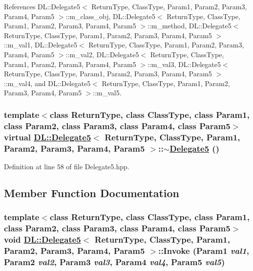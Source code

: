 References DL::Delegate5$<$ Return\-Type, Class\-Type, Param1, Param2, Param3, Param4, Param5 $>$::m\_\-class\_\-obj, DL::Delegate5$<$ Return\-Type, Class\-Type, Param1, Param2, Param3, Param4, Param5 $>$::m\_\-method, DL::Delegate5$<$ Return\-Type, Class\-Type, Param1, Param2, Param3, Param4, Param5 $>$::m\_\-val1, DL::Delegate5$<$ Return\-Type, Class\-Type, Param1, Param2, Param3, Param4, Param5 $>$::m\_\-val2, DL::Delegate5$<$ Return\-Type, Class\-Type, Param1, Param2, Param3, Param4, Param5 $>$::m\_\-val3, DL::Delegate5$<$ Return\-Type, Class\-Type, Param1, Param2, Param3, Param4, Param5 $>$::m\_\-val4, and DL::Delegate5$<$ Return\-Type, Class\-Type, Param1, Param2, Param3, Param4, Param5 $>$::m\_\-val5.\hypertarget{classDL_1_1Delegate5_a1}{
\subsubsection[$\sim$Delegate5]{\setlength{\rightskip}{0pt plus 5cm}template$<$class Return\-Type, class Class\-Type, class Param1, class Param2, class Param3, class Param4, class Param5$>$ virtual \hyperlink{classDL_1_1Delegate5}{DL::Delegate5}$<$ Return\-Type, Class\-Type, Param1, Param2, Param3, Param4, Param5 $>$::$\sim$\hyperlink{classDL_1_1Delegate5}{Delegate5} ()}}
\label{classDL_1_1Delegate5_a1}




Definition at line 58 of file Delegate5.hpp.

\subsection{Member Function Documentation}
\hypertarget{classDL_1_1Delegate5_a3}{
\subsubsection[Invoke]{\setlength{\rightskip}{0pt plus 5cm}template$<$class Return\-Type, class Class\-Type, class Param1, class Param2, class Param3, class Param4, class Param5$>$ void \hyperlink{classDL_1_1Delegate5}{DL::Delegate5}$<$ Return\-Type, Class\-Type, Param1, Param2, Param3, Param4, Param5 $>$::Invoke (Param1 {\em val1}, Param2 {\em val2}, Param3 {\em val3}, Param4 {\em val4}, Param5 {\em val5})}}
\label{classDL_1_1Delegate5_a3}




